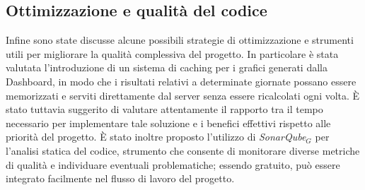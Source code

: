 \documentclass[10pt, letterpaper]{article}
\begin{document}
\subsection{Ottimizzazione e qualità del codice}
Infine sono state discusse alcune possibili strategie di ottimizzazione e strumenti utili per migliorare la qualità complessiva del progetto.
\noindent
In particolare è stata valutata l’introduzione di un sistema di caching per i grafici generati dalla Dashboard, in modo che i risultati relativi a determinate giornate possano essere memorizzati e serviti direttamente dal server senza essere ricalcolati ogni volta. È stato tuttavia suggerito di valutare attentamente il rapporto tra il tempo necessario per implementare tale soluzione e i benefici effettivi rispetto alle priorità del progetto.
\noindent
È stato inoltre proposto l’utilizzo di \textit{SonarQube$_G$} per l’analisi statica del codice, strumento che consente di monitorare diverse metriche di qualità e individuare eventuali problematiche; essendo gratuito, può essere integrato facilmente nel flusso di lavoro del progetto.







\makeDecisionTable






\makeTodoTable
\end{document}
